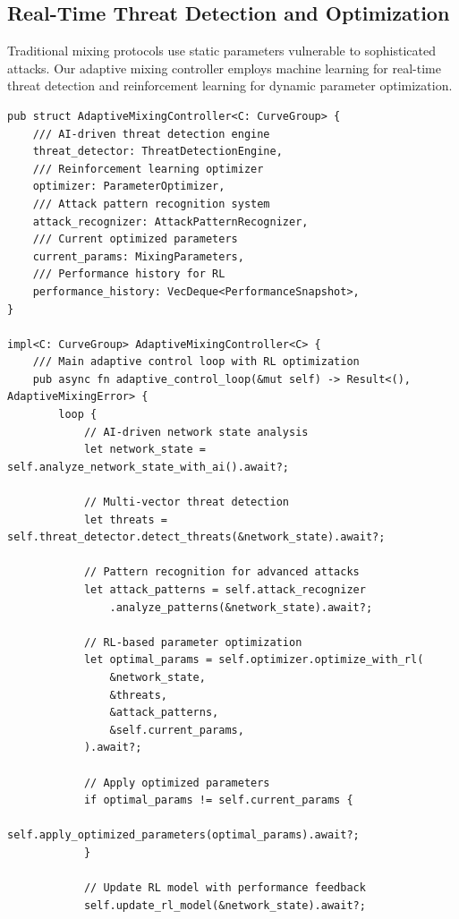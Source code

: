 \documentclass[12pt,a4paper]{article}
\begin{document}
\subsection{Real-Time Threat Detection and Optimization}

Traditional mixing protocols use static parameters vulnerable to sophisticated attacks. Our adaptive mixing controller employs machine learning for real-time threat detection and reinforcement learning for dynamic parameter optimization.

\begin{lstlisting}[style=rustcode, caption=Adaptive AI/ML Mixing Controller]
pub struct AdaptiveMixingController<C: CurveGroup> {
    /// AI-driven threat detection engine
    threat_detector: ThreatDetectionEngine,
    /// Reinforcement learning optimizer
    optimizer: ParameterOptimizer,
    /// Attack pattern recognition system
    attack_recognizer: AttackPatternRecognizer,
    /// Current optimized parameters
    current_params: MixingParameters,
    /// Performance history for RL
    performance_history: VecDeque<PerformanceSnapshot>,
}

impl<C: CurveGroup> AdaptiveMixingController<C> {
    /// Main adaptive control loop with RL optimization
    pub async fn adaptive_control_loop(&mut self) -> Result<(), AdaptiveMixingError> {
        loop {
            // AI-driven network state analysis
            let network_state = self.analyze_network_state_with_ai().await?;
            
            // Multi-vector threat detection
            let threats = self.threat_detector.detect_threats(&network_state).await?;
            
            // Pattern recognition for advanced attacks
            let attack_patterns = self.attack_recognizer
                .analyze_patterns(&network_state).await?;
            
            // RL-based parameter optimization
            let optimal_params = self.optimizer.optimize_with_rl(
                &network_state,
                &threats,
                &attack_patterns,
                &self.current_params,
            ).await?;
            
            // Apply optimized parameters
            if optimal_params != self.current_params {
                self.apply_optimized_parameters(optimal_params).await?;
            }
            
            // Update RL model with performance feedback
            self.update_rl_model(&network_state).await?;
            

\end{lstlisting}
\end{document}
